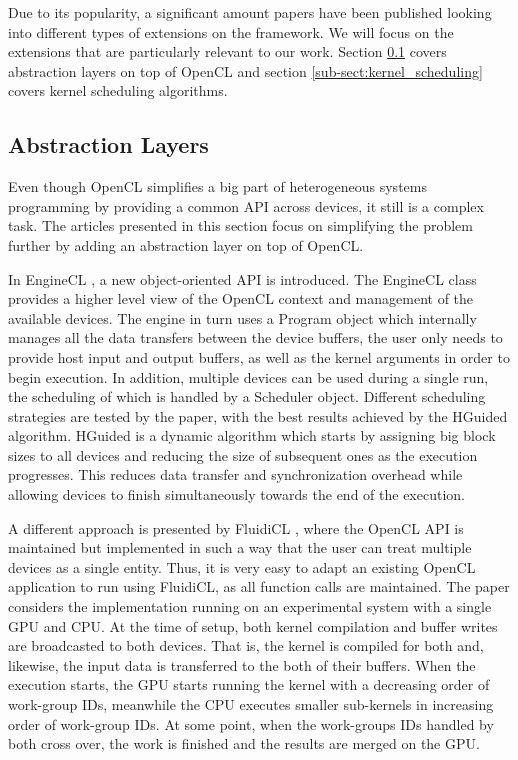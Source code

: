Due to its popularity, a significant amount papers have been published looking into different types of extensions on the framework. We will focus on the extensions that are particularly relevant to our work. Section \ref{sub-sect:abstraction-layers} covers abstraction layers on top of OpenCL and section \ref{sub-sect:kernel_scheduling} covers kernel scheduling algorithms.

\subsection{Abstraction Layers} \label{sub-sect:abstraction-layers}
Even though OpenCL simplifies a big part of heterogeneous systems programming by providing a common API across devices, it still is a complex task. 
The articles presented in this section focus on simplifying the problem further by adding an abstraction layer on top of OpenCL.

In EngineCL \cite{enginecl}, a new object-oriented API is introduced. The EngineCL class provides a higher level view of the OpenCL context and management of the available devices. The engine in turn uses a Program object which internally manages all the data transfers between the device buffers, the user only needs to provide host input and output buffers, as well as the kernel arguments in order to begin execution. In addition, multiple devices can be used during a single run, the scheduling of which is handled by a Scheduler object. Different scheduling strategies are tested by the paper, with the best results achieved by the HGuided algorithm. HGuided is a dynamic algorithm which starts by assigning big block sizes to all devices and reducing the size of subsequent ones as the execution progresses. This reduces data transfer and synchronization overhead while allowing devices to finish simultaneously towards the end of the execution.

A different approach is presented by FluidiCL \cite{fluidicl}, where the OpenCL API is maintained but implemented in such a way that the user can treat multiple devices as a single entity. Thus, it is very easy to adapt an existing OpenCL application to run using FluidiCL, as all function calls are maintained. The paper considers the implementation running on an experimental system with a single GPU and CPU. At the time of setup, both kernel compilation and buffer writes are broadcasted to both devices. That is, the kernel is compiled for both and, likewise, the input data is transferred to the both of their buffers. When the execution starts, the GPU starts running the kernel with a decreasing order of work-group IDs, meanwhile the CPU executes smaller sub-kernels in increasing order of work-group IDs. At some point, when the work-groups IDs handled by both cross over, the work is finished and the results are merged on the GPU.

